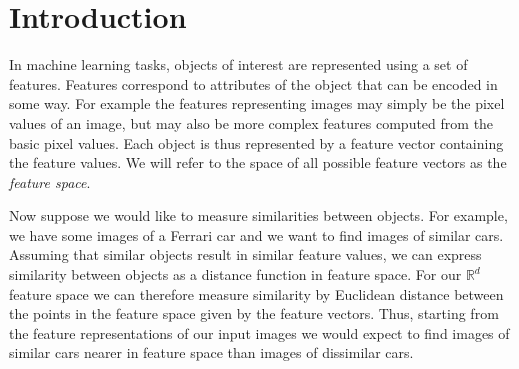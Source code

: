 









\chapter{Introduction}

In machine learning tasks, objects of interest are represented using a set of features. Features correspond to attributes of the object that can be encoded in some way. For example the features representing images may simply be the pixel values of an image, but may also be more complex features computed from the basic pixel values. Each object is thus represented by a feature vector containing the feature values. We will refer to the space of all possible feature vectors as the \emph{feature space}.

Now suppose we would like to measure similarities between objects. For example, we have some images of a Ferrari car and we want to find images of similar cars. Assuming that similar objects result in similar feature values, we can express similarity between objects as a distance function in feature space. For our $\mathbb{R}^d$ feature space we can therefore measure similarity by Euclidean distance between the points in the feature space given by the feature vectors. Thus, starting from the feature representations of our input images we would expect to find images of similar cars nearer in feature space than images of dissimilar cars.

